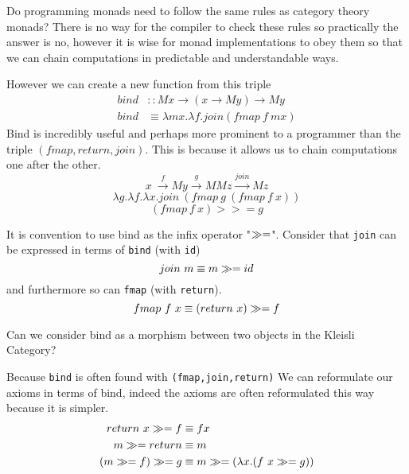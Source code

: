 Do programming monads need to follow the same rules as category theory monads?
There is no way for the compiler to check these rules so practically the answer is no,
however it is wise for monad implementations to obey them so that
we can chain computations in predictable and understandable ways.

However we can create a new function from this triple
\begin{align}
    bind &:: M x \rightarrow (x \rightarrow M y) \rightarrow M y \\
    bind &\equiv \lambda mx. \lambda f. join(fmap\ f\ mx)
\end{align}
Bind is incredibly useful and perhaps more prominent
to a programmer than the triple $(fmap,return,join)$.
This is because it allows us to chain computations
one after the other.
\begin{equation}
    x\
    \stackrel{f}{\rightarrow} My
    \stackrel{g}{\rightarrow} MMz
    \stackrel{join}{\rightarrow} Mz
\end{equation}
\begin{equation}
    \lambda g.
    \lambda f.
    \lambda x.
    join\ (fmap\ g\ (fmap\ f\ x))
\end{equation}
\begin{equation}
    (fmap\ f\ x) >>= g
\end{equation}

It is convention to use bind as the infix operator "$\gg=$".
Consider that \texttt{join} can be expressed in terms of \texttt{bind} (with \texttt{id})
\begin{equation}
    join\ m \equiv m \gg= id
\end{equation}
and furthermore so can \texttt{fmap} (with \texttt{return}).
\begin{equation}
    fmap\ f\ x \equiv (return\ x) \gg= f
\end{equation}

Can we consider bind as a morphism between two objects in the Kleisli Category?

Because \texttt{bind} is often found with \texttt{(fmap,join,return)}
We can reformulate our axioms in terms of bind,
indeed the axioms are often reformulated this way because it is simpler.
\begin{align}
    return\ x \gg= f &\equiv f x \\
    m \gg= return &\equiv m \\
    (m \gg= f) \gg= g &\equiv m \gg= (\lambda x.(f\ x \gg= g))
\end{align}

